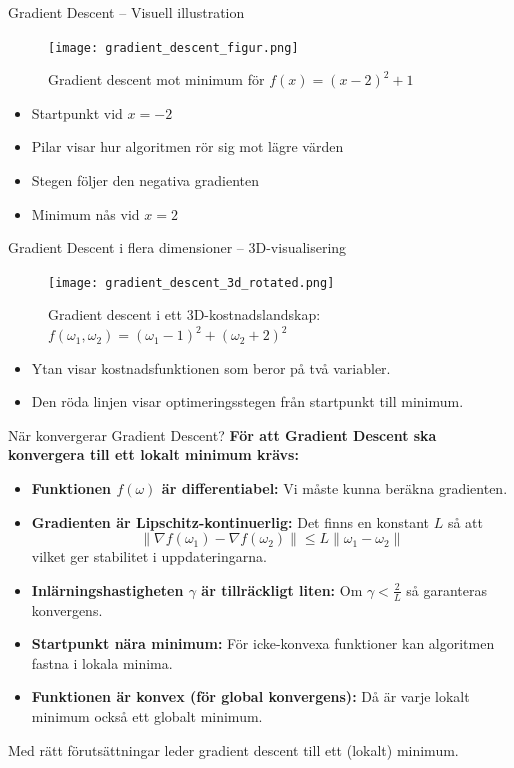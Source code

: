 \documentclass[10pt,english]{beamer}
\begin{document}
\begin{frame}{Gradient Descent – Visuell illustration}
    \begin{figure}[htbp]
        \centering
        \texttt{[image: gradient\_descent\_figur.png]}
        \caption*{Gradient descent mot minimum för $f(x) = (x - 2)^2 + 1$}
    \end{figure}

    \begin{itemize}
        \item Startpunkt vid $x=-2$
        \item Pilar visar hur algoritmen rör sig mot lägre värden
        \item Stegen följer den negativa gradienten
        \item Minimum nås vid $x = 2$
    \end{itemize}
\end{frame}

\begin{frame}{Gradient Descent i flera dimensioner – 3D-visualisering}
    \begin{figure}[htbp]
        \centering
        \texttt{[image: gradient\_descent\_3d\_rotated.png]}
        \caption*{Gradient descent i ett 3D-kostnadslandskap: $f(\omega_1, \omega_2) = (\omega_1 - 1)^2 + (\omega_2 + 2)^2$}
    \end{figure}

    \begin{itemize}
        \item Ytan visar kostnadsfunktionen som beror på två variabler.
        \item Den röda linjen visar optimeringsstegen från startpunkt till minimum.
    \end{itemize}
\end{frame}

\begin{frame}{När konvergerar Gradient Descent?}
    \textbf{För att Gradient Descent ska konvergera till ett lokalt minimum krävs:}
    \begin{itemize}
        \item \textbf{Funktionen $f(\omega)$ är differentiabel:} Vi måste kunna beräkna gradienten.
        \item \textbf{Gradienten är Lipschitz-kontinuerlig:} Det finns en konstant $L$ så att
        \[
        \|\nabla f(\omega_1) - \nabla f(\omega_2)\| \leq L \|\omega_1 - \omega_2\|
        \]
        vilket ger stabilitet i uppdateringarna.
        \item \textbf{Inlärningshastigheten $\gamma$ är tillräckligt liten:} Om $\gamma < \frac{2}{L}$ så garanteras konvergens.
        \item \textbf{Startpunkt nära minimum:} För icke-konvexa funktioner kan algoritmen fastna i lokala minima.
        \item \textbf{Funktionen är konvex (för global konvergens):} Då är varje lokalt minimum också ett globalt minimum.
    \end{itemize}

    Med rätt förutsättningar leder gradient descent till ett (lokalt) minimum.
\end{frame}
\end{document}

